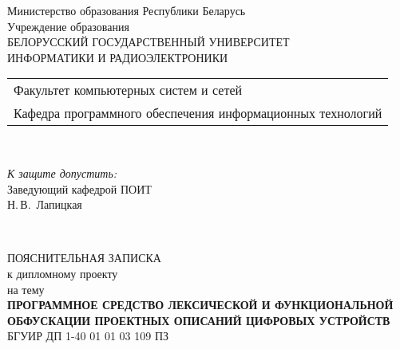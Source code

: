 \begin{titlepage}
  \begin{center}
    Министерство образования Республики Беларусь\\[1em]
    Учреждение образования\\
    БЕЛОРУССКИЙ ГОСУДАРСТВЕННЫЙ УНИВЕРСИТЕТ \\
    ИНФОРМАТИКИ И РАДИОЭЛЕКТРОНИКИ\\[1em]

    \begin{minipage}{\textwidth}
      \begin{flushleft}
        \begin{tabular}{ l }
          Факультет компьютерных систем и сетей\\
          Кафедра программного обеспечения информационных технологий
        \end{tabular}
      \end{flushleft}
    \end{minipage}\\[1em]

    \begin{flushright}
      \begin{minipage}{0.4\textwidth}
        \textit{К защите допустить:}\\[0.8em]
        Заведующий кафедрой ПОИТ\\[0.45em]
        \underline{\hspace*{2.8cm}} Н.\,В.~Лапицкая
      \end{minipage}\\[2.2em]
    \end{flushright}

    {ПОЯСНИТЕЛЬНАЯ ЗАПИСКА}\\
    {к дипломному проекту}\\
    {на тему}\\[1em]
    \textbf{\large ПРОГРАММНОЕ СРЕДСТВО ЛЕКСИЧЕСКОЙ И ФУНКЦИОНАЛЬНОЙ ОБФУСКАЦИИ ПРОЕКТНЫХ ОПИСАНИЙ ЦИФРОВЫХ УСТРОЙСТВ}\\[1em]


    {БГУИР ДП 1-40 01 01 03 109 ПЗ}\\[2em]


\end{center}
\end{titlepage}
